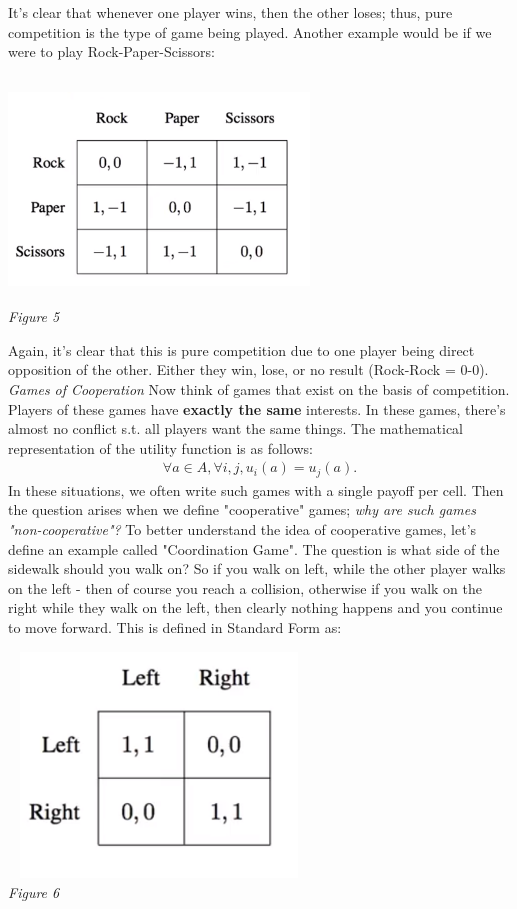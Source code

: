 \documentclass{article}
\begin{document}
It's clear that whenever one player wins, then the other loses; thus, pure competition is the type of game being played. Another example would be if we were to play Rock-Paper-Scissors: 
\begin{center}
    \includegraphics[width = 8cm, height = 6cm]{IMG_005.png} \\
    \emph{Figure 5}
\end{center}
Again, it's clear that this is pure competition due to one player being direct opposition of the other. Either they win, lose, or no result (Rock-Rock = 0-0). 
\vskip 0.1in
\emph{Games of Cooperation}
\vskip 0.1in
Now think of games that exist on the basis of competition. Players of these games have \textbf{exactly the same} interests. In these games, there's almost no conflict s.t. all players want the same things. The mathematical representation of the utility function is as follows:
\begin{align}
    \forall a \in A, \forall i, j, u_{i}(a) = u_{j}(a).
\end{align}
In these situations, we often write such games with a single payoff per cell. Then the question arises when we define "cooperative" games; \emph{why are such games "non-cooperative"?} To better understand the idea of cooperative games, let's define an example called "Coordination Game". The question is what side of the sidewalk should you walk on? So if you walk on left, while the other player walks on the left - then of course you reach a collision, otherwise if you walk on the right while they walk on the left, then clearly nothing happens and you continue to move forward. This is defined in Standard Form as:
\begin{center}
    \includegraphics[width = 8cm, height = 6cm]{IMG_006.png} \\
    \emph{Figure 6}
\end{center}
\end{document}
